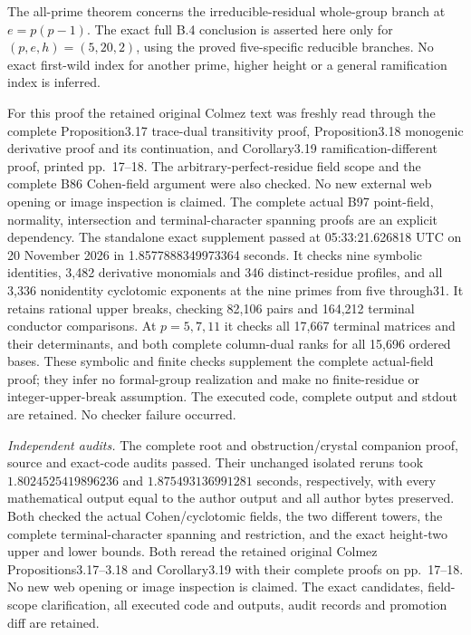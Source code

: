 \begin{remark}
\label{rem:B-RD98-scope}
The all-prime theorem concerns the irreducible-residual
whole-group branch at $e=p(p-1)$. The exact full B.4 conclusion
is asserted here only for $(p,e,h)=(5,20,2)$, using the proved
five-specific reducible branches. No exact first-wild index for
another prime, higher height or a general ramification index
is inferred.

For this proof the retained original Colmez text was freshly
read through the complete Proposition3.17 trace-dual transitivity
proof, Proposition3.18 monogenic derivative proof and its
continuation, and Corollary3.19 ramification-different proof,
printed pp.~17--18. The arbitrary-perfect-residue field scope
and the complete B86 Cohen-field argument were also checked.
No new external web opening or image inspection is claimed.
The complete actual B97 point-field, normality, intersection
and terminal-character spanning proofs are an explicit dependency.
The standalone exact supplement
passed at 05:33:21.626818 UTC on 20 November 2026 in
1.8577888349973364 seconds. It checks nine symbolic identities,
3,482 derivative monomials and 346 distinct-residue profiles,
and all 3,336 nonidentity cyclotomic exponents at the nine primes
from five through31. It retains rational upper breaks, checking
82,106 pairs and 164,212 terminal conductor comparisons. At
$p=5,7,11$ it checks all 17,667 terminal matrices and their
determinants, and both complete column-dual ranks for all 15,696
ordered bases. These symbolic and finite checks supplement the
complete actual-field proof; they infer no formal-group realization
and make no finite-residue or integer-upper-break assumption.
The executed code, complete output and stdout are retained.
No checker failure occurred.

\smallskip
\noindent\emph{Independent audits.}
The complete root and obstruction/crystal companion proof,
source and exact-code audits passed. Their unchanged isolated
reruns took \(1.8024525419896236\) and \(1.875493136991281\) seconds,
respectively, with every mathematical output equal to the author
output and all author bytes preserved. Both checked the actual
Cohen/cyclotomic fields, the two different towers, the complete
terminal-character spanning and restriction, and the exact
height-two upper and lower bounds. Both reread the retained
original Colmez Propositions3.17--3.18 and Corollary3.19 with
their complete proofs on pp.~17--18. No new web opening or
image inspection is claimed. The exact candidates, field-scope
clarification, all executed code and outputs, audit records and
promotion diff are retained.
\end{remark}
